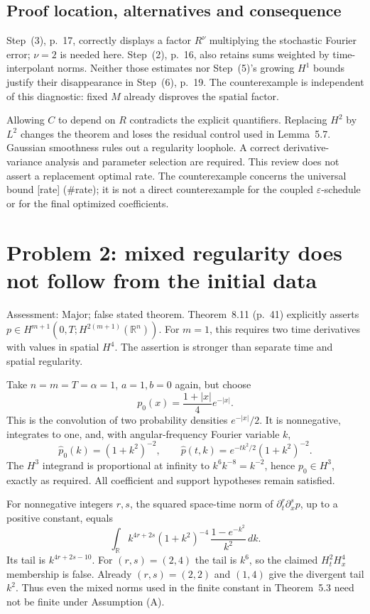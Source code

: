 \documentclass[10pt]{article}
\begin{document}
\subsection*{Proof location, alternatives and consequence}
Step (3), p. 17, correctly displays a factor \(R^\nu\) multiplying the stochastic Fourier error; \(\nu=2\) is needed here. Step (2), p. 16, also retains sums weighted by time-interpolant norms. Neither those estimates nor Step (5)’s growing \(H^1\) bounds justify their disappearance in Step (6), p. 19. The counterexample is independent of this diagnostic: fixed \(M\) already disproves the spatial factor.\par
Allowing \(C\) to depend on \(R\) contradicts the explicit quantifiers. Replacing \(H^2\) by \(L^2\) changes the theorem and loses the residual control used in Lemma 5.7. Gaussian smoothness rules out a regularity loophole. A correct derivative-variance analysis and parameter selection are required. This review does not assert a replacement optimal rate. The counterexample concerns the universal bound [rate] (\#rate); it is not a direct counterexample for the coupled \(\varepsilon\)-schedule or for the final optimized coefficients.\par
\section*{Problem 2: mixed regularity does not follow from the initial data}
Assessment: Major; false stated theorem. Theorem 8.11 (p. 41) explicitly asserts \(p\in H^{m+1}(0,T;H^{2(m+1)}(\mathbb R^n))\). For \(m=1\), this requires two time derivatives with values in spatial \(H^4\). The assertion is stronger than separate time and spatial regularity.\par
Take \(n=m=T=\alpha=1\), \(a=1,b=0\) again, but choose \[p_0(x)=\frac{1+|x|}{4}e^{-|x|}.\] This is the convolution of two probability densities \(e^{-|x|}/2\). It is nonnegative, integrates to one, and, with angular-frequency Fourier variable \(k\), \[\widehat p_0(k)=(1+k^2)^{-2},\qquad
 \widehat p(t,k)=e^{-tk^2/2}(1+k^2)^{-2}.\] The \(H^3\) integrand is proportional at infinity to \(k^6 k^{-8}=k^{-2}\), hence \(p_0\in H^3\), exactly as required. All coefficient and support hypotheses remain satisfied.\par
For nonnegative integers \(r,s\), the squared space-time norm of \(\partial_t^r\partial_x^s p\), up to a positive constant, equals \[\int_{\mathbb R}
 k^{4r+2s}(1+k^2)^{-4}\,
 \frac{1-e^{-k^2}}{k^2}\,dk .\] Its tail is \(k^{4r+2s-10}\). For \((r,s)=(2,4)\) the tail is \(k^6\), so the claimed \(H^2_tH^4_x\) membership is false. Already \((r,s)=(2,2)\) and \((1,4)\) give the divergent tail \(k^2\). Thus even the mixed norms used in the finite constant in Theorem 5.3 need not be finite under Assumption (A).\par
\end{document}
